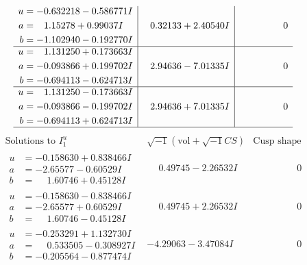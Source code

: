 \documentclass[1p]{elsarticle_modified}
\theoremstyle{definition}
\newcommand{\I}{\sqrt{-1}}
\begin{document}
$$\begin{array}{c|c|c}
\begin{aligned}
u &= -0.632218 - 0.586771 I \\
a &= \phantom{-}1.15278 + 0.99037 I \\
b &= -1.102940 - 0.192770 I\end{aligned}
 & \phantom{-}0.32133 + 2.40540 I & \phantom{-0.000000 } 0 \\ \hline\begin{aligned}
u &= \phantom{-}1.131250 + 0.173663 I \\
a &= -0.093866 + 0.199702 I \\
b &= -0.694113 - 0.624713 I\end{aligned}
 & \phantom{-}2.94636 - 7.01335 I & \phantom{-0.000000 } 0 \\ \hline\begin{aligned}
u &= \phantom{-}1.131250 - 0.173663 I \\
a &= -0.093866 - 0.199702 I \\
b &= -0.694113 + 0.624713 I\end{aligned}
 & \phantom{-}2.94636 + 7.01335 I & \phantom{-0.000000 } 0\\
 \hline 
 \end{array}$$\newpage$$\begin{array}{c|c|c}  
\text{Solutions to }I^u_{1}& \I (\text{vol} + \sqrt{-1}CS) & \text{Cusp shape}\\
 \hline 
\begin{aligned}
u &= -0.158630 + 0.838466 I \\
a &= -2.65577 - 0.60529 I \\
b &= \phantom{-}1.60746 + 0.45128 I\end{aligned}
 & \phantom{-}0.49745 - 2.26532 I & \phantom{-0.000000 } 0 \\ \hline\begin{aligned}
u &= -0.158630 - 0.838466 I \\
a &= -2.65577 + 0.60529 I \\
b &= \phantom{-}1.60746 - 0.45128 I\end{aligned}
 & \phantom{-}0.49745 + 2.26532 I & \phantom{-0.000000 } 0 \\ \hline\begin{aligned}
u &= -0.253291 + 1.132730 I \\
a &= \phantom{-}0.533505 - 0.308927 I \\
b &= -0.205564 - 0.877474 I\end{aligned}
 & -4.29063 - 3.47084 I & \phantom{-0.000000 } 0 \\ \hline\begin{aligned}

\end{aligned}
\end{array}$$
\end{document}
